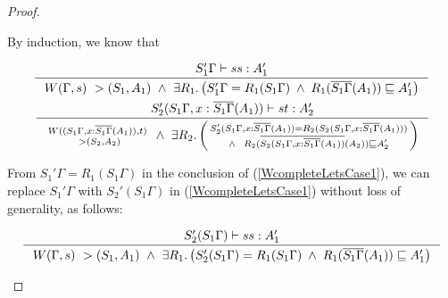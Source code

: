 \begin{proof}
\begin{itemize}
        By induction, we know that \vspace*{-2em}
        \begin{singlespace}
        \begin{align}
        \inference{S_1'\Gamma |-s s : A_1'}{
        W(\Gamma,s) ~> (S_1,A_1)
        ~\land~
        \exists R_1.
                \left( S_1'\Gamma=R_1(S_1\Gamma) \;\land\;
                        R_1(\overline{S_1\Gamma}(A_1)) \sqsubseteq A_1'
                \right) }
        \label{WcompleteLetsCase1}
        \\
        \inference{S_2'(S_1\Gamma,x:\overline{S_1\Gamma}(A_1)) |-s t : A_2'}{
        \begin{smallmatrix} W((S_1\Gamma,x:\overline{S_1\Gamma}(A_1)),t) \\
                ~> (S_2,A_2)
        \end{smallmatrix}
        ~\land~
        \exists R_2.
                \left(\begin{smallmatrix}
                        S_2'(S_1\Gamma,x:\overline{S_1\Gamma}(A_1))=R_2(S_2(S_1\Gamma,x:\overline{S_1\Gamma}(A_1))) \\ \land ~~
                        R_2(\overline{S_2(S_1\Gamma,x:\overline{S_1\Gamma}(A_1))}(A_2))
                        \sqsubseteq A_2'
                \end{smallmatrix}\right) }
        \label{WcompleteLetsCase2}
        \end{align}
        \end{singlespace}

        From $S_1'\Gamma = R_1(S_1\Gamma)$ in the conclusion of 
        (\ref{WcompleteLetsCase1}), we can replace $S_1'\Gamma$
        with $S_2'(S_1\Gamma)$ in (\ref{WcompleteLetsCase1})
        without loss of generality, as follows: \vspace*{-2em}
        \begin{singlespace}
        \[
        \inference{ S_2'(S_1\Gamma) |-s s : A_1' }{
        W(\Gamma,s) ~> (S_1,A_1)
        ~\land~ \exists R_1.
                \left( S_2'(S_1\Gamma)=R_1(S_1\Gamma) \;\land\;
                        R_1(\overline{S_1\Gamma}(A_1)) \sqsubseteq A_1'
                \right) }
        \]
        \end{singlespace}


\end{itemize}
\end{proof}
